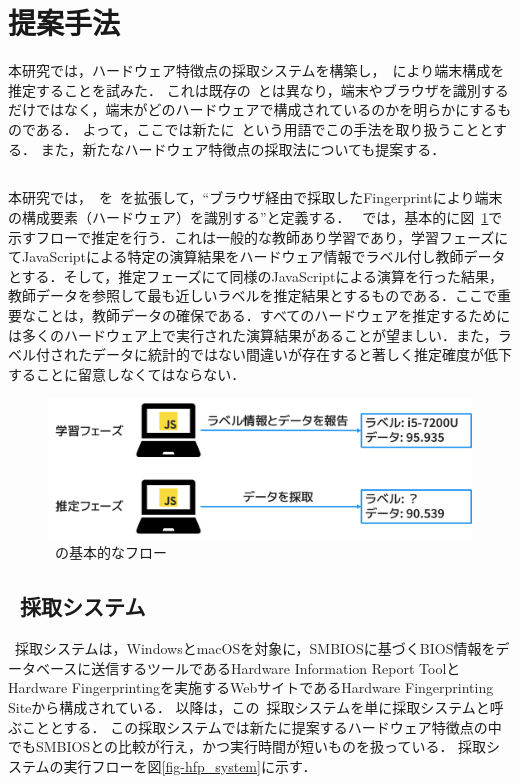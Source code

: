 \newpage
\section{提案手法}
本研究では，ハードウェア特徴点の採取システムを構築し，\fp~により端末構成を推定することを試みた．
これは既存の\fp~とは異なり，端末やブラウザを識別するだけではなく，端末がどのハードウェアで構成されているのかを明らかにするものである．
よって，ここでは新たに\hfp~という用語でこの手法を取り扱うこととする．
また，新たなハードウェア特徴点の採取法についても提案する．

\subsection{\hfp}
本研究では，\hfp~を\fp~を拡張して，``ブラウザ経由で採取したFingerprintにより端末の構成要素（ハードウェア）を識別する''と定義する．
\hfp~では，基本的に図~\ref{fig-hfp}で示すフローで推定を行う．これは一般的な教師あり学習であり，学習フェーズにてJavaScriptによる特定の演算結果をハードウェア情報でラベル付し教師データとする．そして，推定フェーズにて同様のJavaScriptによる演算を行った結果，教師データを参照して最も近しいラベルを推定結果とするものである．ここで重要なことは，教師データの確保である．すべてのハードウェアを推定するためには多くのハードウェア上で実行された演算結果があることが望ましい．また，ラベル付されたデータに統計的ではない間違いが存在すると著しく推定確度が低下することに留意しなくてはならない．
\begin{figure}[H]
	\centering
    \includegraphics[width=\textwidth,pagebox=artbox]{fig/hfp.png}
    \caption{\hfp~の基本的なフロー}
    \label{fig-hfp}
\end{figure}

\subsection{\hfp~採取システム}
\hfp~採取システムは，WindowsとmacOSを対象に，SMBIOSに基づくBIOS情報をデータベースに送信するツールであるHardware Information Report ToolとHardware Fingerprintingを実施するWebサイトであるHardware Fingerprinting Siteから構成されている．
以降は，この\hfp~採取システムを単に採取システムと呼ぶこととする．
この採取システムでは新たに提案するハードウェア特徴点の中でもSMBIOSとの比較が行え，かつ実行時間が短いものを扱っている．
採取システムの実行フローを図\ref{fig-hfp_system}に示す．

